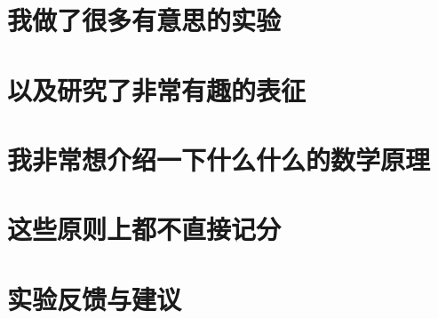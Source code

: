 \documentclass[UTF8,a4paper]{ctexart}
\begin{document}
\section{我做了很多有意思的实验}

\section{以及研究了非常有趣的表征}

\section{我非常想介绍一下什么什么的数学原理}

\section{这些原则上都不直接记分}

\section{实验反馈与建议}
\end{document}
